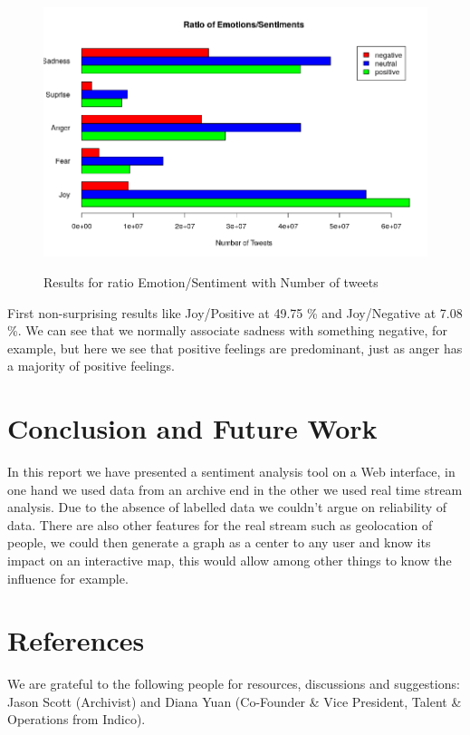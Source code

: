 \documentclass{acmtog} %
\begin{document}
\begin{figure}[h!]
{\includegraphics[width=\linewidth]{final_plot_contradiction_analysis.png}}
\caption{Results for ratio Emotion/Sentiment with Number of tweets}
  \label{fig:contradiction_barplot}
\end{figure}

First non-surprising results like Joy/Positive at 49.75 \% and Joy/Negative at 7.08 \%.
We can see that we normally associate sadness with something negative, for example, but here we see that positive feelings are predominant, just as anger has a majority of positive feelings.


\section{Conclusion and Future Work}
\label{sec:conclusion}

In this report we have presented a sentiment analysis tool on a Web interface, in one hand we used data from an archive end in the other we used real time stream analysis. Due to the absence of labelled data we couldn't argue on reliability of data. 
There are also other features for the real stream such as geolocation of people, we could then generate a graph as a center to any user and know its impact on an interactive map, this would allow among other things to know the influence for example.


\section{References}

\begin{acks}
We are grateful to the following people for resources, discussions and suggestions: Jason Scott (Archivist) and Diana Yuan (Co-Founder & Vice President, Talent & Operations from Indico).
\end{acks}




\end{document}
